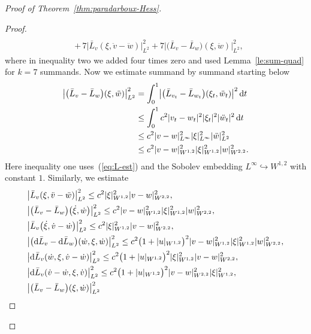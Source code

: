 \documentclass[pdftex]{sigma}
\numberwithin{equation}{section}
\def\abs#1{\mathopen|#1\mathclose|}
\newcommand{\INTO}{\hookrightarrow} %
\newcommand{\1}{{{\mathchoice {\rm 1\mskip-4mu l} {\rm 1\mskip-4mu l}
{\rm 1\mskip-4.5mu l} {\rm 1\mskip-5mu l}}}}
\begin{document}
\begin{proof}[Proof of Theorem~\ref{thm:paradarboux-Hess}]
\begin{proof}
\begin{equation*}
\begin{split}
 \\
 &{+}\,7\bigl|\bar L_v(\xi,\ddot v-\ddot w)\bigr|_{L^2}^2
 +7\bigl|\bigl(\bar L_v-\bar L_w\bigr)(\xi,\ddot w)\bigr|_{L^2}^2,
\end{split}
\end{equation*}
where in inequality two we added four times zero
and used Lemma~\ref{le:sum-quad} for $k=7$ summands.
Now we estimate summand by summand starting below
\begin{equation*}
\begin{split}
 \bigl|\bigl(\bar L_v-\bar L_w\bigr)(\xi,\ddot w)\bigr|_{L^2}^2
 &=\int_0^1\bigl|\bigl(\bar L_{v_t}-\bar L_{w_t}\bigr) (\xi_t,\ddot w_t)\bigr|^2\, {\rm d}t
\\
 &\le \int_0^1c^2
 \abs{v_t-w_t}^2\abs{\xi_t}^2\abs{\ddot w_t}^2\, {\rm d}t
\\
 &\le c^2 \abs{v-w}_{L^\infty}^2\abs{\xi}_{L^\infty}^2
 \abs{\ddot w}_{L^2}^2
\\
 &\le c^2 \abs{v-w}_{W^{1,2}}^2\abs{\xi}_{W^{1,2}}^2
 \abs{w}_{W^{2,2}}^2 .
\end{split}
\end{equation*}
Here inequality one uses~(\ref{eq:L-est}) and the Sobolev embedding
$L^\infty\INTO W^{1,2}$ with constant $1$.
Similarly, we estimate
\begin{equation*}
\begin{split}
& \bigl|\bar L_v(\xi,\ddot v-\ddot w)\bigr|_{L^2}^2
\le c^2 \abs{\xi}_{W^{1,2}}^2\abs{v-w}_{W^{2,2}}^2,
\\
& \bigl|\bigl(\bar L_v-\bar L_w\bigr)\bigl(\dot \xi,\dot w\bigr)\bigr|_{L^2}^2
\le c^2 \abs{v-w}_{W^{1,2}}^2 \abs{\xi}_{W^{1,2}}^2 \abs{w}_{W^{2,2}}^2,
\\
& \bigl|\bar L_v\bigl(\dot \xi,\dot v-\dot w\bigr)\bigr|_{L^2}^2
\le c^2 \abs{\xi}_{W^{1,2}}^2 \abs{v-w}_{W^{2,2}}^2,
\\
& \bigl|\bigl({\rm d}\bar L_v-{\rm d}\bar L_w\bigr)(\dot w,\xi,\dot w)\bigr|_{L^2}^2
\le c^2 \bigl(1+\abs{u}_{W^{1,2}} \bigr)^2
 \abs{v-w}_{W^{1,2}}^2
 \abs{\xi}_{W^{1,2}}^2\abs{w}_{W^{2,2}}^2,
\\
& \bigl|{\rm d}\bar L_v(\dot w,\xi,\dot v-\dot w)\bigr|_{L^2}^2
\le c^2 \bigl(1+\abs{u}_{W^{1,2}} \bigr)^2 \abs{\xi}_{W^{1,2}}^2
 \abs{v-w}_{W^{2,2}}^2,
\\
& \bigl|{\rm d}\bar L_v(\dot v-\dot w,\xi,\dot v)\bigr|_{L^2}^2
\le c^2 \bigl(1+\abs{u}_{W^{1,2}} \bigr)^2
 \abs{v-w}_{W^{2,2}}^2\abs{\xi}_{W^{1,2}}^2,
\\
& \bigl|\bigl(\bar L_v-\bar L_w\bigr) (\xi,\dot w)\bigr|_{L^2}^2

\end{split}
\end{equation*}
\end{proof}
\end{proof}
\end{document}
